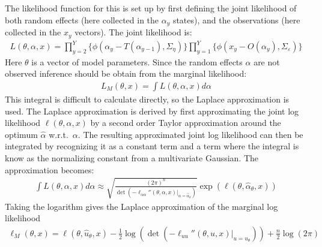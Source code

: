 \documentclass[12pt,letterpaper, leqno]{article}
\begin{document}
The likelihood function for this is set up by first defining the joint likelihood of both random effects (here collected in the $\alpha_y$ states), and the observations (here collected in the $x_y$ vectors). The joint likelihood is:
 \begin{align*}
 L(\theta,\alpha,x)=\prod_{y=2}^Y\{ \phi(\alpha_y-T(\alpha_{y-1}),\Sigma_\eta)\}
                    \prod_{y=1}^Y\{ \phi(x_y-O(\alpha_{y}),\Sigma_\varepsilon)\}
 \end{align*}
 Here $\theta$ is a vector of model parameters. Since the random effects $\alpha$ are not observed inference should be obtain from the marginal likelihood:
 \begin{align*}
 L_M(\theta,x)=\int L(\theta,\alpha,x) d\alpha
 \end{align*}
 This integral is difficult to calculate directly, so the Laplace  approximation is used. The Laplace approximation is derived by first  approximating the joint log likelihood $\ell(\theta,\alpha,x)$ by a  second order Taylor approximation around the optimum $\hat{\alpha}$  w.r.t.~$\alpha$. The resulting approximated joint log likelihood can  then be integrated by recognizing it as a constant term and a term  where the integral is know as the normalizing constant from a  multivariate Gaussian. The approximation becomes:
 \begin{align*}
 \int L(\theta,\alpha,x)d\alpha \approx  \sqrt{\frac{(2\pi)^{n}}{\det(-\ell_{\alpha\alpha}''(\theta,\alpha,x)|_{\alpha=\hat{\alpha}_\theta})}}\exp(\ell(\theta,\hat{\alpha}_\theta,x))
 \end{align*}
 Taking the logarithm gives the Laplace approximation of the marginal log likelihood  
 \begin{align*}
 \ell_M(\theta,x) = \ell(\theta,\hat{u}_\theta,x)-\frac{1}{2}\log(\det(-\ell_{uu}
 ''(\theta,u,x)|_{u=\hat{u}_\theta}))+\frac{n}{2}\log(2\pi)
 \end{align*}
\end{document}
